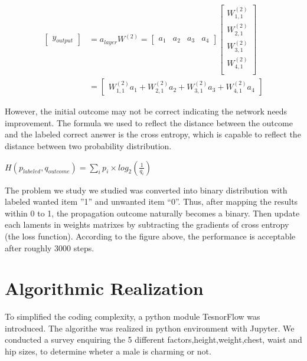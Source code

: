 \documentclass{article}
\begin{document}
\begin{spacing}{2}
    \begin{align*} 
        {\left[ \begin{array}{c}
        y_{output}
        \end{array}\right]}&=
        a_{layer}W^{(2)}
        ={\left[ \begin{array}{cccc}
            a_1&a_2&a_3&a_4
             \end{array}\right]}
        {\left[ \begin{array}{c}
            W^{(2)}_{1,1}\\
            W^{(2)}_{2,1}\\
            W^{(2)}_{3,1}\\
            W^{(2)}_{4,1}\\
        \end{array}\right]}\\
        &={\left[ \begin{array}{c}
            W^{(2)}_{1,1}a_1+W^{(2)}_{2,1}a_2+W^{(2)}_{3,1}a_3+W^{(2)}_{4,1}a_4
        \end{array}\right]}
    \end{align*}

    \noindent However, the initial outcome may not be correct indicating the network needs improvement. The formula we used to reflect the distance between the outcome and the labeled correct answer is the cross entropy, which is capable to reflect the distance between two probability distribution. 

    \begin{center}
    $H(p_{labeled},q_{outcome})=$$\sum_{i}p_i{\times}log_2(\frac{1}{q_i})$\\
    \end{center}

    \noindent The problem we study we studied was converted into binary distribution with labeled wanted item ”1” and unwanted item “0”. Thus, after mapping the results within 0 to 1, the propagation outcome naturally becomes a binary. Then update each laments in weights matrixes by subtracting the gradients of cross entropy (the loss function). According to the figure above, the performance is acceptable after roughly 3000 steps.
    
    \section{Algorithmic Realization}

    To simplified the coding complexity, a python module TesnorFlow\cite{TensorFlow} was introduced. The algorithe was realized in python environment with Jupyter\cite{Jupyter}. We conducted a survey enquiring the 5 different factors,height,weight,chest, waist and hip sizes, to determine wheter a male is charming or not.\\


\end{spacing}
\end{document}
